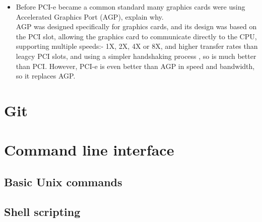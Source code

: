 \documentclass[a4paper]{article}
\begin{document}
\begin{itemize}
    \item Before PCI-e became a common standard many graphics cards were using Accelerated Graphics Port (AGP), explain why.\\AGP was designed specifically for graphics cards, and its design was based on the PCI slot, allowing the graphics card to communicate directly to the CPU, supporting multiple speeds:- 1X, 2X, 4X or 8X, and higher transfer rates than leagcy PCI slots, and using a simpler handshaking process \cite{agppcie}, so is much better than PCI. However, PCI-e is even better than AGP in speed and bandwidth, so it replaces AGP.
\end{itemize}
\section{Git}
\section{Command line interface}
\subsection{Basic Unix commands}
\subsection{Shell scripting}
\end{document}
